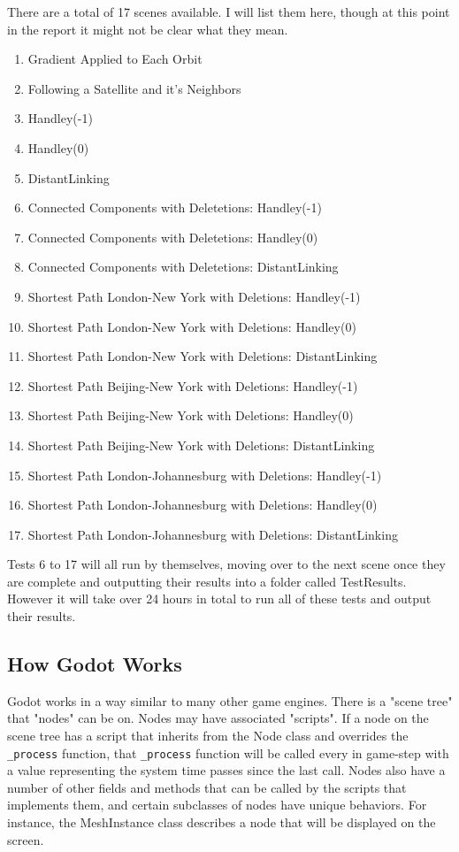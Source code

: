 \documentclass[12pt,a4paper,twoside,openright]{report}
\begin{document}
There are a total of 17 scenes available. I will list them here, though at this point in the report it might not be clear what they mean.

\begin{enumerate}
\item Gradient Applied to Each Orbit
\item Following a Satellite and it's Neighbors
\item Handley(-1)
\item Handley(0)
\item DistantLinking
\item Connected Components with Deletetions: Handley(-1)
\item Connected Components with Deletetions: Handley(0)
\item Connected Components with Deletetions: DistantLinking
\item Shortest Path London-New York with Deletions: Handley(-1)
\item Shortest Path London-New York with Deletions: Handley(0)
\item Shortest Path London-New York with Deletions: DistantLinking
\item Shortest Path Beijing-New York with Deletions: Handley(-1)
\item Shortest Path Beijing-New York with Deletions: Handley(0)
\item Shortest Path Beijing-New York with Deletions: DistantLinking
\item Shortest Path London-Johannesburg with Deletions: Handley(-1)
\item Shortest Path London-Johannesburg with Deletions: Handley(0)
\item Shortest Path London-Johannesburg with Deletions: DistantLinking
\end{enumerate}

Tests 6 to 17 will all run by themselves, moving over to the next scene once they are complete and outputting their results into a folder called TestResults. However it will take over 24 hours in total to run all of these tests and output their results.

\subsection{How Godot Works}
Godot works in a way similar to many other game engines. There is a "scene tree" that "nodes" can be on. Nodes may have associated "scripts". If a node on the scene tree has a script that inherits from the Node class and overrides the \lstinline{_process} function, that \lstinline{_process} function will be called every in game-step with a value representing the system time passes since the last call. Nodes also have a number of other fields and methods that can be called by the scripts that implements them, and certain subclasses of nodes have unique behaviors. For instance, the MeshInstance class describes a node that will be displayed on the screen.
\end{document}
